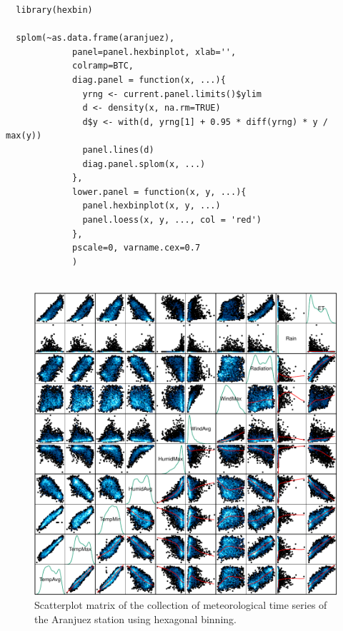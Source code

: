 \documentclass[smallroyalvopaper]{memoir}
\begin{document}

\lstset{language=r,label= ,caption= ,captionpos=b,numbers=none}
\begin{lstlisting}
  library(hexbin)
  
  splom(~as.data.frame(aranjuez),
             panel=panel.hexbinplot, xlab='',
             colramp=BTC,
             diag.panel = function(x, ...){
               yrng <- current.panel.limits()$ylim
               d <- density(x, na.rm=TRUE)
               d$y <- with(d, yrng[1] + 0.95 * diff(yrng) * y / max(y))
               panel.lines(d)
               diag.panel.splom(x, ...)
             },
             lower.panel = function(x, y, ...){
               panel.hexbinplot(x, y, ...)
               panel.loess(x, y, ..., col = 'red')
             },
             pscale=0, varname.cex=0.7
             )
  
\end{lstlisting}

\begin{figure}[htbp]
\centering
\includegraphics[width=.9\linewidth]{figs/aranjuezSplomHexbin.pdf}
\caption{Scatterplot matrix of the collection of meteorological time series of the Aranjuez station using hexagonal binning. \label{fig:aranjuezSplomHexbin}}
\end{figure}
\end{document}
